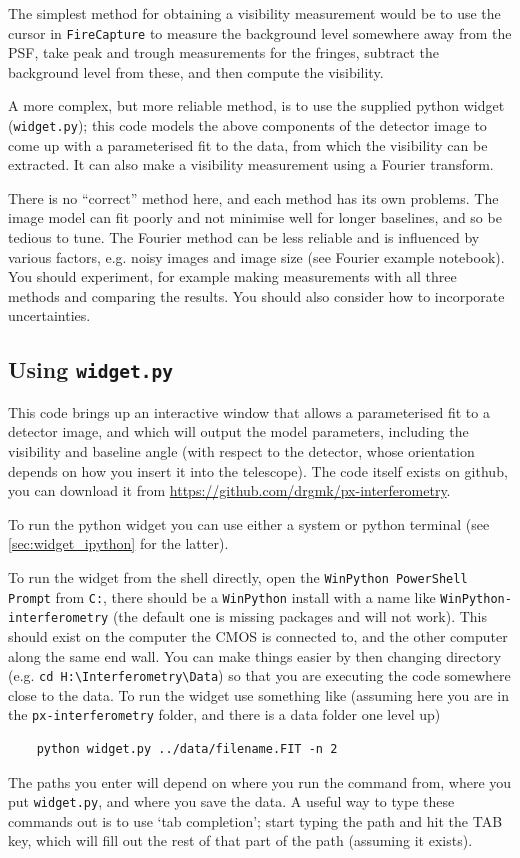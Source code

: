 \documentclass[11pt]{article}
\begin{document}
The simplest method for obtaining a visibility measurement would be to use the cursor in \texttt{FireCapture} to measure the background level somewhere away from the PSF, take peak and trough measurements for the fringes, subtract the background level from these, and then compute the visibility.

A more complex, but more reliable method, is to use the supplied python widget (\texttt{widget.py}); this code models the above components of the detector image to come up with a parameterised fit to the data, from which the visibility can be extracted. It can also make a visibility measurement using a Fourier transform.

There is no ``correct'' method here, and each method has its own problems. The image model can fit poorly and not minimise well for longer baselines, and so be tedious to tune. The Fourier method can be less reliable and is influenced by various factors, e.g. noisy images and image size (see Fourier example notebook). You should experiment, for example making measurements with all three methods and comparing the results. You should also consider how to incorporate uncertainties.

\subsection{Using \texttt{widget.py}}\label{sec:widget}

This code brings up an interactive window that allows a parameterised fit to a detector image, and which will output the model parameters, including the visibility and baseline angle (with respect to the detector, whose orientation depends on how you insert it into the telescope). The code itself exists on github, you can download it from
\href{https://github.com/drgmk/px-interferometry}{https://github.com/drgmk/px-interferometry}.

To run the python widget you can use either a system or python terminal (see \ref{sec:widget_ipython} for the latter).

To run the widget from the shell directly, open the \texttt{WinPython PowerShell Prompt} from \texttt{C:}, there should be a \texttt{WinPython} install with a name like \texttt{WinPython-interferometry} (the default one is missing packages and will not work). This should exist on the computer the CMOS is connected to, and the other computer along the same end wall. You can make things easier by then changing directory (e.g. \texttt{cd H:\textbackslash Interferometry\textbackslash Data}) so that you are executing the code somewhere close to the data. To run the widget use something like (assuming here you are in the \texttt{px-interferometry} folder, and there is a data folder one level up)
\begin{verbatim}
    python widget.py ../data/filename.FIT -n 2
\end{verbatim}
The paths you enter will depend on where you run the command from, where you put \texttt{widget.py}, and where you save the data. A useful way to type these commands out is to use `tab completion'; start typing the path and hit the TAB key, which will fill out the rest of that part of the path (assuming it exists).
\end{document}
